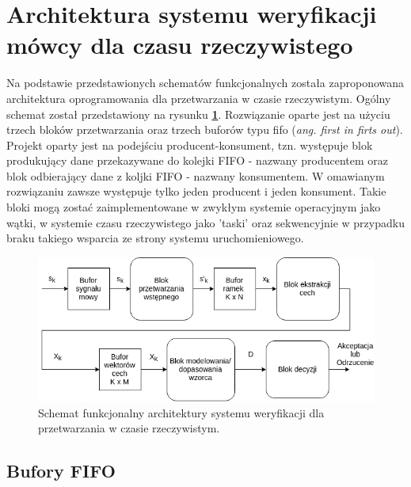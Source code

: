 \section{Architektura systemu weryfikacji mówcy dla czasu rzeczywistego}

Na podstawie przedstawionych schematów funkcjonalnych została zaproponowana architektura oprogramowania dla przetwarzania w czasie rzeczywistym. Ogólny schemat został przedstawiony na rysunku \textbf{\ref{fig:overallrt}}. Rozwiązanie oparte jest na użyciu trzech bloków przetwarzania oraz trzech buforów typu fifo (\textit{ang. first in firts out}). Projekt oparty jest na podejściu producent-konsument, tzn. występuje blok produkujący dane przekazywane do kolejki FIFO - nazwany producentem oraz blok odbierający dane z koljki FIFO - nazwany konsumentem.  W omawianym rozwiązaniu zawsze występuje tylko jeden producent i jeden konsument. Takie bloki mogą zostać zaimplementowane w zwykłym systemie operacyjnym jako wątki, w systemie czasu rzeczywistego jako 'taski' oraz sekwencyjnie w przypadku braku takiego wsparcia ze strony systemu uruchomieniowego. 

\begin{figure}[ht!]
  \centering
    \includegraphics[width=1\textwidth]{./overallrt.png}
    \caption{\label{fig:overallrt} Schemat funkcjonalny architektury systemu weryfikacji dla przetwarzania w czasie rzeczywistym.}
\end{figure}

\subsection{Bufory FIFO}

